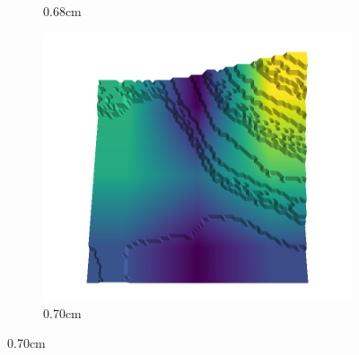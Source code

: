 \documentclass[../document.tex]{subfiles}
\begin{document}
\begin{figure}[H]
\begin{subfigure}[b]{0.192\linewidth}
    \caption{0.68cm}
    \label{fig : quarry-best-18}
    \end{subfigure}
    \begin{subfigure}[b]{0.192\linewidth}
    \includegraphics[width=\linewidth]{../img/5/quarry/best/70-patch-3d-majavi-colormap-190.png}
    \caption{0.70cm}
    \label{fig : quarry-best-19}
    \end{subfigure}
    \label{fig : quarry-best}
    \end{figure}
\end{document}
